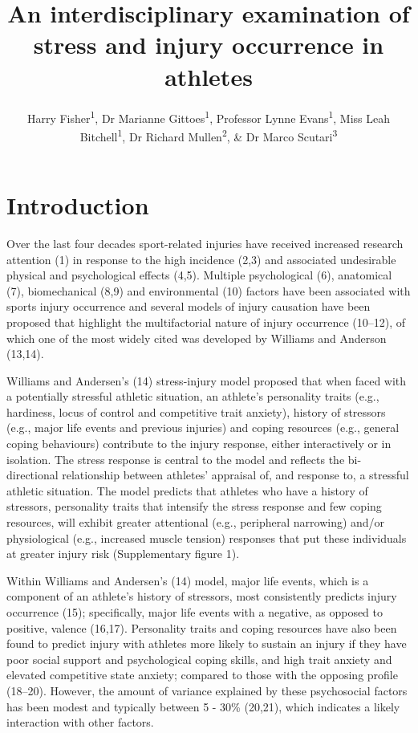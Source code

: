 \documentclass[
  english,
  man]{apa6}
\author{Harry Fisher\textsuperscript{1}, Dr Marianne Gittoes\textsuperscript{1}, Professor Lynne Evans\textsuperscript{1}, Miss Leah Bitchell\textsuperscript{1}, Dr Richard Mullen\textsuperscript{2}, \& Dr Marco Scutari\textsuperscript{3}}
\affiliation{
\vspace{0.5cm}
\textsuperscript{1} Cardiff Metropolitan University, Cardiff, United Kingdom\\\textsuperscript{2} Brunel University, London, United Kingdom\\\textsuperscript{3} Istituto Dalle Molle di Studi sull'Intelligenza Artificiale (IDSIA), Manno, Switzerland}
\title{An interdisciplinary examination of stress and injury occurrence in athletes}
\date{}
\begin{document}
\maketitle

\hypertarget{introduction}{%
\section{Introduction}\label{introduction}}

Over the last four decades sport-related injuries have received increased research attention (1) in response to the high incidence (2,3) and associated undesirable physical and psychological effects (4,5). Multiple psychological (6), anatomical (7), biomechanical (8,9) and environmental (10) factors have been associated with sports injury occurrence and several models of injury causation have been proposed that highlight the multifactorial nature of injury occurrence (10--12), of which one of the most widely cited was developed by Williams and Anderson (13,14).

Williams and Andersen's (14) stress-injury model proposed that when faced with a potentially stressful athletic situation, an athlete's personality traits (e.g., hardiness, locus of control and competitive trait anxiety), history of stressors (e.g., major life events and previous injuries) and coping resources (e.g., general coping behaviours) contribute to the injury response, either interactively or in isolation. The stress response is central to the model and reflects the bi-directional relationship between athletes' appraisal of, and response to, a stressful athletic situation. The model predicts that athletes who have a history of stressors, personality traits that intensify the stress response and few coping resources, will exhibit greater attentional (e.g., peripheral narrowing) and/or physiological (e.g., increased muscle tension) responses that put these individuals at greater injury risk (Supplementary figure 1).

Within Williams and Andersen's (14) model, major life events, which is a component of an athlete's history of stressors, most consistently predicts injury occurrence (15); specifically, major life events with a negative, as opposed to positive, valence (16,17).
Personality traits and coping resources have also been found to predict injury with athletes more likely to sustain an injury if they have poor social support and psychological coping skills, and high trait anxiety and elevated competitive state anxiety; compared to those with the opposing profile (18--20).
However, the amount of variance explained by these psychosocial factors has been modest and typically between 5 - 30\% (20,21), which indicates a likely interaction with other factors.
\end{document}
